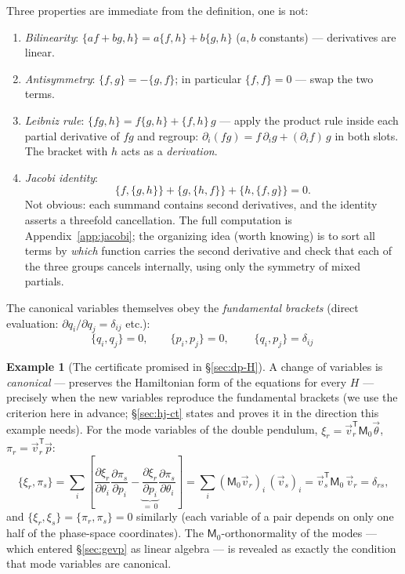 \documentclass[11pt]{article}
\theoremstyle{plain}
\theoremstyle{definition}
\newtheorem{example}[theorem]{Example}
\theoremstyle{remark}
\newcommand{\pd}[2]{\frac{\partial #1}{\partial #2}}
\newcommand{\vp}{\vec{p}}
\newcommand{\vth}{\vec{\theta}}
\newcommand{\mM}{\mathsf{M}}
\begin{document}
Three properties are immediate from the definition, one is not:
\begin{enumerate}
  \item \emph{Bilinearity}: $\{af + bg, h\} = a\{f,h\} + b\{g,h\}$
  ($a,b$ constants) --- derivatives are linear.
  \item \emph{Antisymmetry}: $\{f,g\} = -\{g,f\}$; in particular
  $\{f,f\}=0$ --- swap the two terms.
  \item \emph{Leibniz rule}: $\{fg, h\} = f\{g,h\} + \{f,h\}\,g$ --- apply
  the product rule inside each partial derivative of $fg$ and regroup:
  $\partial_i(fg) = f\,\partial_i g + (\partial_i f)\,g$ in both slots.
  The bracket with $h$ acts as a \emph{derivation}.
  \item \emph{Jacobi identity}:
  \begin{equation}
    \boxed{\;
    \{f, \{g,h\}\} + \{g, \{h,f\}\} + \{h, \{f,g\}\} = 0 .
    \;}
  \end{equation}
  Not obvious: each summand contains second derivatives, and the identity
  asserts a threefold cancellation. The full computation is
  Appendix~\ref{app:jacobi}; the organizing idea (worth knowing) is to
  sort all terms by \emph{which} function carries the second derivative
  and check that each of the three groups cancels internally, using only
  the symmetry of mixed partials.
\end{enumerate}

The canonical variables themselves obey the \emph{fundamental brackets}
(direct evaluation: $\partial q_i/\partial q_j = \delta_{ij}$ etc.):
\begin{equation}
  \{q_i, q_j\} = 0,
  \qquad
  \{p_i, p_j\} = 0,
  \qquad
  \boxed{\;\{q_i, p_j\} = \delta_{ij}\;}
\end{equation}

\begin{example}[The certificate promised in \S\ref{sec:dp-H}]
\label{ex:mode-canonical}
A change of variables is \emph{canonical} --- preserves the Hamiltonian
form of the equations for every $H$ --- precisely when the new variables
reproduce the fundamental brackets (we use the criterion here in advance;
\S\ref{sec:hj-ct} states and proves it in the direction this example
needs). For the mode variables of the double pendulum,
$\xi_r = \vec v_r^{\mathsf T}\mM_0\vth$,
$\pi_r = \vec v_r^{\mathsf T}\vp$:
\begin{equation}
  \{\xi_r, \pi_s\}
  = \sum_i \left[\pd{\xi_r}{\theta_i}\pd{\pi_s}{p_i}
  - \underbrace{\pd{\xi_r}{p_i}}_{=\,0}\pd{\pi_s}{\theta_i}\right]
  = \sum_i (\mM_0\vec v_r)_i\,(\vec v_s)_i
  = \vec v_s^{\mathsf T}\mM_0\,\vec v_r
  = \delta_{rs} ,
\end{equation}
and $\{\xi_r,\xi_s\} = \{\pi_r,\pi_s\} = 0$ similarly (each
variable of a pair depends on only one half of the phase-space
coordinates). The $\mM_0$-orthonormality of the modes --- which entered
\S\ref{sec:gevp} as linear algebra --- is revealed as exactly the
condition that mode variables are canonical.
\end{example}
\end{document}
